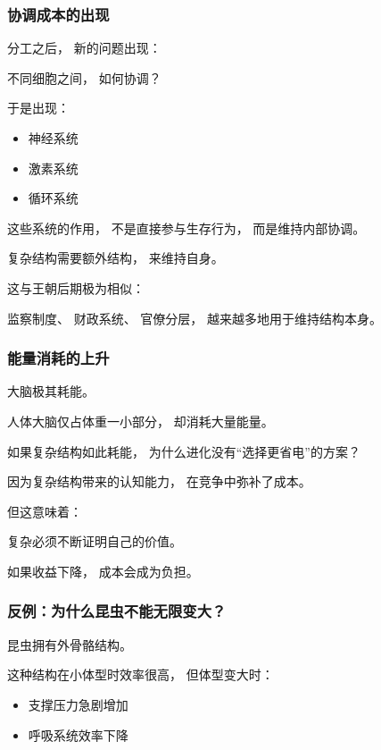 \documentclass[../main.tex]{subfiles}
\begin{document}
\subsubsection{协调成本的出现}

分工之后，
新的问题出现：

不同细胞之间，
如何协调？

于是出现：

\begin{itemize}
	\item 神经系统
	\item 激素系统
	\item 循环系统
\end{itemize}

这些系统的作用，
不是直接参与生存行为，
而是维持内部协调。

\begin{readingnote}
	复杂结构需要额外结构，
	来维持自身。
\end{readingnote}

这与王朝后期极为相似：

监察制度、
财政系统、
官僚分层，
越来越多地用于维持结构本身。

\subsubsection{能量消耗的上升}

大脑极其耗能。

人体大脑仅占体重一小部分，
却消耗大量能量。

\begin{questionbox}
	如果复杂结构如此耗能，
	为什么进化没有“选择更省电”的方案？
\end{questionbox}

因为复杂结构带来的认知能力，
在竞争中弥补了成本。

但这意味着：

复杂必须不断证明自己的价值。

如果收益下降，
成本会成为负担。

\subsubsection{反例：为什么昆虫不能无限变大？}

昆虫拥有外骨骼结构。

这种结构在小体型时效率很高，
但体型变大时：

\begin{itemize}
	\item 支撑压力急剧增加
	\item 呼吸系统效率下降
\end{itemize}
\end{document}

